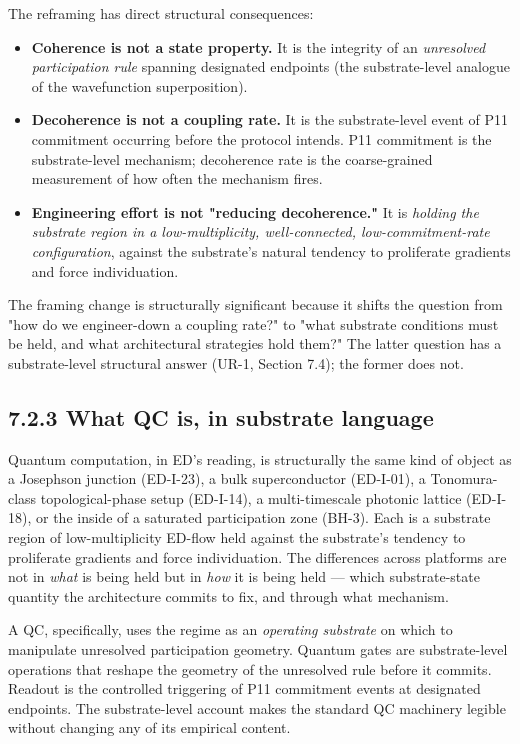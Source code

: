 \documentclass[11pt]{book}
\begin{document}
The reframing has direct structural consequences:

\begin{itemize}
\item \textbf{Coherence is not a state property.} It is the integrity of an \textit{unresolved participation rule} spanning designated endpoints (the substrate-level analogue of the wavefunction superposition).
\item \textbf{Decoherence is not a coupling rate.} It is the substrate-level event of P11 commitment occurring before the protocol intends. P11 commitment is the substrate-level mechanism; decoherence rate is the coarse-grained measurement of how often the mechanism fires.
\item \textbf{Engineering effort is not "reducing decoherence."} It is \textit{holding the substrate region in a low-multiplicity, well-connected, low-commitment-rate configuration}, against the substrate's natural tendency to proliferate gradients and force individuation.
\end{itemize}

The framing change is structurally significant because it shifts the question from "how do we engineer-down a coupling rate?" to "what substrate conditions must be held, and what architectural strategies hold them?" The latter question has a substrate-level structural answer (UR-1, Section 7.4); the former does not.

\subsection{7.2.3 What QC is, in substrate language}

Quantum computation, in ED's reading, is structurally the same kind of object as a Josephson junction (ED-I-23), a bulk superconductor (ED-I-01), a Tonomura-class topological-phase setup (ED-I-14), a multi-timescale photonic lattice (ED-I-18), or the inside of a saturated participation zone (BH-3). Each is a substrate region of low-multiplicity ED-flow held against the substrate's tendency to proliferate gradients and force individuation. The differences across platforms are not in \textit{what} is being held but in \textit{how} it is being held — which substrate-state quantity the architecture commits to fix, and through what mechanism.

A QC, specifically, uses the regime as an \textit{operating substrate} on which to manipulate unresolved participation geometry. Quantum gates are substrate-level operations that reshape the geometry of the unresolved rule before it commits. Readout is the controlled triggering of P11 commitment events at designated endpoints. The substrate-level account makes the standard QC machinery legible without changing any of its empirical content.
\end{document}
